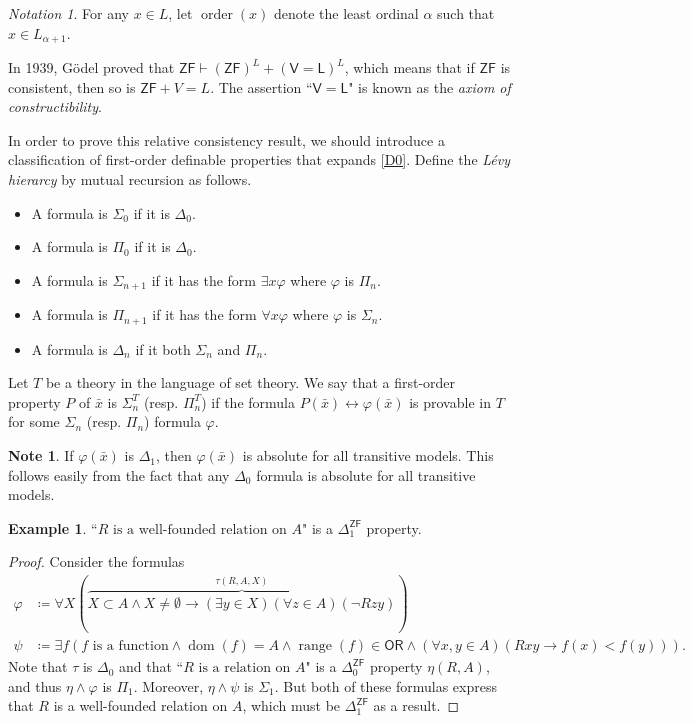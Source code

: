 \documentclass[10pt,letterpaper,cm]{nupset}
\theoremstyle{definition}
\newtheorem{exmp}[definition]{Example}
\newtheorem{note}[definition]{Note}
\theoremstyle{theorem}
\theoremstyle{remark}
\newtheorem*{notation}{Notation}
\newcommand{\1}{\mathbf{1}}
\newcommand{\0}{\vec 0}
\newcommand{\zf}{\mathsf{ZF}}
\newcommand{\ord}{\mathsf{OR}}
\newcommand{\VL}{\mathsf{V=L}}
\DeclareMathOperator{\rng}{range}
\DeclareMathOperator{\dom}{dom}
\DeclareMathOperator{\order}{order}
\newcommand{\bi}{\begin{itemize}}
\newcommand{\ei}{\end{itemize}}
\begin{document}
\begin{notation}
For any $x\in L$, let $\order(x)$ denote the least ordinal $\alpha$ such that $x\in L_{\alpha +1}$.
\end{notation}

\smallskip

In 1939, G\"odel proved that $\zf \vdash \left(\zf\right)^L + \left(\VL\right)^L$, which means that if $\zf$ is consistent, then so is $\zf + {V=L}$. The assertion ``$\VL$" is known as the \textit{axiom of constructibility}.

\medskip

In order to prove this relative consistency result, we should introduce a classification of first-order definable properties that expands \cref{D0}. Define the \textit{L\'evy hierarcy} by mutual recursion as follows.

\bi 
\item A formula is $\Sigma_0$ if it is $\Delta_0$.
\item A formula is $\Pi_0$ if it is $\Delta_0$.
\item A formula is $\Sigma_{n+1}$ if it has the form $\exists{x}\varphi$ where $\varphi$ is $\Pi_n$.
\item A formula is $\Pi_{n+1}$ if it has the form $\forall{x}\varphi$ where $\varphi$ is $\Sigma_n$.
\item A formula is $\Delta_n$ if it both $\Sigma_n$ and $\Pi_n$.
\ei

Let $T$ be a theory in the language of set theory. We say that a first-order property $P$ of $\bar{x}$ is $\Sigma_n^T$ (resp. $\Pi_n^T$) if the formula
$P(\bar{x}) \leftrightarrow \varphi(\bar{x})$ is provable in $T$ for some $\Sigma_n$ (resp. $\Pi_n$) formula $\varphi$.

\begin{note}
If $\varphi(\bar{x})$ is $\Delta_1$, then $\varphi(\bar{x})$ is absolute for all transitive models. This follows easily from the fact that any $\Delta_0$ formula is absolute for all transitive models.
\end{note}

\begin{exmp}
``$R \text{ is a well-founded relation on }A$" is a $\Delta_1^{\zf}$ property.
\end{exmp}
\begin{proof}
Consider the formulas
\begin{align*}
\varphi & \coloneqq \forall{X}\left(\overbrace{X \subset A \land X \ne \emptyset \rightarrow \left(\exists{y \in X}\right)\left(\forall{z \in A}\right)\left(\neg{Rzy}\right)}^{\tau(R, A, X)}\right)
\\ \psi &  \coloneqq \exists{f}\left(f \text{ is a function} \land \dom(f) = A \land \rng(f) \in  \ord \land \left(\forall{x,y\in A}\right)\left(Rxy \rightarrow f(x) < f(y)\right)\right).
\end{align*}
Note that $\tau$ is $\Delta_0$ and that ``$R \text{ is a relation on }A$" is a $\Delta_0^{\zf}$ property $\eta(R, A)$, and thus $\eta \land \varphi$ is $\Pi_1$. Moreover, $\eta \land \psi$ is $\Sigma_1$. But both of these formulas express that $R$ is a well-founded relation on $A$, which must be $\Delta_1^{\zf}$ as a result.
\end{proof}
\end{document}
